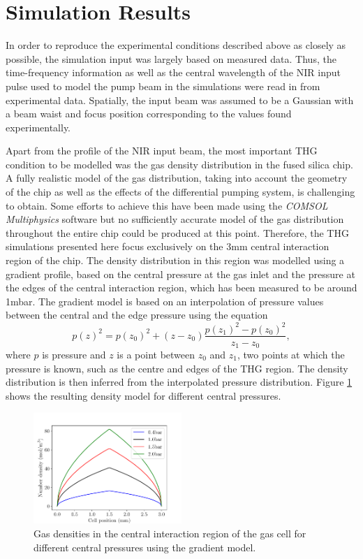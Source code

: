 \documentclass[a4paper]{jpconf}
\begin{document}
\section{Simulation Results}
In order to reproduce the experimental conditions described above as closely as possible, the simulation input was largely based on measured data. Thus, the time-frequency information as well as the central wavelength of the NIR input pulse used to model the pump beam in the simulations were read in from experimental data. Spatially, the input beam was assumed to be a Gaussian with a beam waist and focus position corresponding to the values found experimentally. \par 
Apart from the profile of the NIR input beam, the most important THG condition to be modelled was the gas density distribution in the fused silica chip. A fully realistic model of the gas distribution, taking into account the geometry of the chip as well as the effects of the differential pumping system, is challenging to obtain. Some efforts to achieve this have been made using the \textit{COMSOL Multiphysics} software but no sufficiently accurate model of the gas distribution throughout the entire chip could be produced at this point. Therefore, the THG simulations presented here focus exclusively on the 3mm central interaction region of the chip. The density distribution in this region was modelled using a gradient profile, based on the central pressure at the gas inlet and the pressure at the edges of the central interaction region, which has been measured to be around 1mbar. The gradient model is based on an interpolation of pressure values between the central and the edge pressure using the equation 
\begin{equation}
p(z)^2 = p(z_0)^2 + (z-z_0) \frac{p(z_1)^2 - p(z_0)^2}{z_1 - z_0}, 
\end{equation}
where $p$ is pressure and $z$ is a point between $z_0$ and $z_1$, two points at which the pressure is known, such as the centre and edges of the THG region. The density distribution is then inferred from the interpolated pressure distribution. Figure \ref{im:grad} shows the resulting density model for different central pressures. \par 
\begin{figure}[h]
\centering
\includegraphics[width=0.5\textwidth]{im/grad_model}
\caption{Gas densities in the central interaction region of the gas cell for different central pressures using the gradient model.}\label{im:grad}
\end{figure} 
\end{document}
